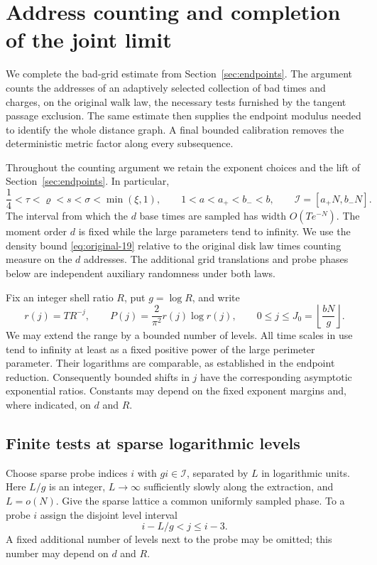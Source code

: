 \section{Address counting and completion of the joint limit}\label{sec:address}

We complete the bad-grid estimate from Section~\ref{sec:endpoints}.  The
argument counts the addresses of an adaptively selected collection of bad
times and charges, on the original walk law, the necessary tests furnished
by the tangent passage exclusion.  The same estimate then supplies the
endpoint modulus needed to identify the whole distance graph.  A final
bounded calibration removes the deterministic metric factor along every
subsequence.

Throughout the counting argument we retain the exponent choices and the
lift of Section~\ref{sec:endpoints}.  In particular,
\[
 \frac14<\tau<\varrho<s<\sigma<\min(\xi,1),\qquad
 1<a<a_+<b_-<b,
 \qquad \mathcal I=[a_+N,b_-N].
\]
The interval from which the $d$ base times are sampled has width
$O(Te^{-N})$.  The moment order $d$ is fixed while the large parameters
tend to infinity.  We use the density bound
\eqref{eq:original-19} relative to the original disk law times counting
measure on the $d$ addresses.  The additional grid translations and probe
phases below are independent auxiliary randomness under both laws.

Fix an integer shell ratio $R$, put $g=\log R$, and write
\begin{equation}\label{addr:scales}
 r(j)=TR^{-j},\qquad
 P(j)=\frac{2}{\pi^2}r(j)\log r(j),\qquad
 0\le j\le J_0=\left\lfloor\frac{bN}{g}\right\rfloor.
\end{equation}
We may extend the range by a bounded number of levels.  All time scales
in use tend to infinity at least as a fixed positive power of the large
perimeter parameter.  Their logarithms are comparable, as established in
the endpoint reduction.  Consequently bounded shifts in $j$ have the
corresponding asymptotic exponential ratios.  Constants may depend on
the fixed exponent margins and, where indicated, on $d$ and $R$.

\subsection{Finite tests at sparse logarithmic levels}

Choose sparse probe indices $i$ with $gi\in\mathcal I$, separated by
$L$ in logarithmic units.  Here $L/g$ is an integer, $L\to\infty$
sufficiently slowly along the extraction, and $L=o(N)$.  Give the sparse
lattice a common uniformly sampled phase.  To a probe $i$ assign the
disjoint level interval
\begin{equation}\label{addr:assigned-levels}
                       i-L/g<j\le i-3.
\end{equation}
A fixed additional number of levels next to the probe may be omitted;
this number may depend on $d$ and $R$.

